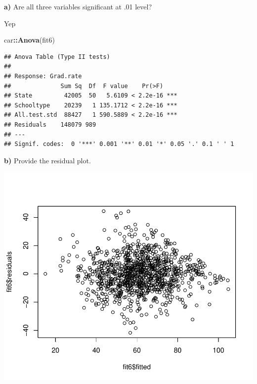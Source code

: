 \documentclass[]{article}
\newenvironment{Shaded}{\begin{snugshade}}{\end{snugshade}}
\newcommand{\KeywordTok}[1]{\textcolor[rgb]{0.13,0.29,0.53}{\textbf{#1}}}
\newcommand{\OperatorTok}[1]{\textcolor[rgb]{0.81,0.36,0.00}{\textbf{#1}}}
\newcommand{\NormalTok}[1]{#1}
\begin{document}
\textbf{a)} Are all three variables significant at .01 level?

Yep

\begin{Shaded}
\begin{Highlighting}[]
\NormalTok{car}\OperatorTok{::}\KeywordTok{Anova}\NormalTok{(fit6)}
\end{Highlighting}
\end{Shaded}

\begin{verbatim}
## Anova Table (Type II tests)
## 
## Response: Grad.rate
##              Sum Sq  Df  F value    Pr(>F)    
## State         42005  50   5.6109 < 2.2e-16 ***
## Schooltype    20239   1 135.1712 < 2.2e-16 ***
## All.test.std  88427   1 590.5889 < 2.2e-16 ***
## Residuals    148079 989                       
## ---
## Signif. codes:  0 '***' 0.001 '**' 0.01 '*' 0.05 '.' 0.1 ' ' 1
\end{verbatim}

\textbf{b)} Provide the residual plot.

\begin{Shaded}
\end{Shaded}

\begin{flushleft}\includegraphics{Midterm_11_01_2016_Answers_files/figure-latex/unnamed-chunk-35-1} \end{flushleft}
\end{document}
